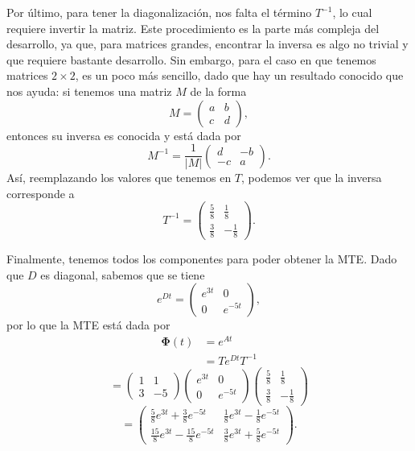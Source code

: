\documentclass[
  11pt,
  letterpaper,
   addpoints,
   answers
  ]{exam}
\begin{document}
\begin{questions}
\begin{solution}
Por último, para tener la diagonalización, nos falta el término $T^{-1}$, lo cual requiere invertir
la matriz. Este procedimiento es la parte más compleja del desarrollo, ya que, para matrices grandes,
encontrar la inversa es algo no trivial y que requiere bastante desarrollo. Sin embargo, para el caso en que
tenemos matrices $2\times 2$, es un poco más sencillo, dado que hay un resultado conocido que nos ayuda:
si tenemos una matriz $M$ de la forma
\begin{equation}
M=\begin{pmatrix}
a & b\\
c & d
\end{pmatrix},
\end{equation}
entonces su inversa es conocida y está dada por
\begin{equation}
M^{-1}=\frac{1}{|M|}
\begin{pmatrix}
d & -b\\
-c & a
\end{pmatrix}.
\end{equation}
Así, reemplazando los valores que tenemos en $T$, podemos ver que la inversa corresponde a
\begin{equation}
T^{-1}=\begin{pmatrix}
\frac{5}{8} & \frac{1}{8}\\[4pt]
\frac{3}{8} & -\frac{1}{8}
\end{pmatrix}.
\end{equation}

Finalmente, tenemos todos los componentes para poder obtener la MTE. Dado que $D$ es diagonal,
sabemos que se tiene
\begin{equation}
e^{Dt}=\begin{pmatrix}
e^{3t} & 0\\
0 & e^{-5t}
\end{pmatrix},
\end{equation}
por lo que la MTE está dada por
\begin{align}
\boldsymbol{\Phi}(t)&=e^{At}\\
&=Te^{Dt}T^{-1}
\end{align}
\begin{equation}
=\begin{pmatrix}
1 & 1\\
3 & -5
\end{pmatrix}
\begin{pmatrix}
e^{3t} & 0\\
0 & e^{-5t}
\end{pmatrix}
\begin{pmatrix}
\frac{5}{8} & \frac{1}{8}\\[4pt]
\frac{3}{8} & -\frac{1}{8}
\end{pmatrix}
\end{equation}
\begin{equation}
=\begin{pmatrix}
\frac{5}{8}e^{3t}+\frac{3}{8}e^{-5t} &
\frac{1}{8}e^{3t}-\frac{1}{8}e^{-5t}\\[4pt]
\frac{15}{8}e^{3t}-\frac{15}{8}e^{-5t} &
\frac{3}{8}e^{3t}+\frac{5}{8}e^{-5t}
\end{pmatrix}.
\end{equation}


\end{solution}
\end{questions}
\end{document}
